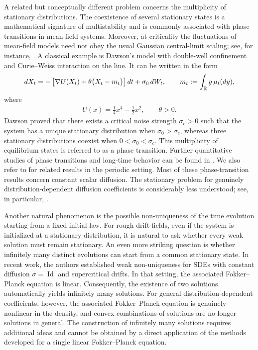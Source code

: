 \documentclass[10pt,a4paper]{amsart}
\numberwithin{equation}{section}
\def\dif{{\mathord{{\rm d}}}}
\def\dif{{\mathord{{\rm d}}}}
\begin{document}
A related but conceptually different problem concerns the multiplicity of
stationary distributions. The coexistence of several stationary states is a
mathematical signature of multistability and is commonly associated with phase
transitions in mean-field systems. Moreover, at criticality the fluctuations
of mean-field models need not obey the usual Gaussian central-limit scaling;
see, for instance, \cite{EN78a,EN78b,Daw83}.
A classical example is Dawson's model with double-well confinement and
Curie--Weiss interaction on the line. It can be written in the form
\begin{align}
\dif X_t
=
-
\left[
\nabla U(X_t)
+
\theta\bigl(X_t-m_t\bigr)
\right]\dif t
+
\sigma_0\,\dif W_t,
\qquad
m_t
:=
\int_{\mathbb{R}}y\,\mu_t(\dif y),\notag
\end{align}
where 
\begin{align*}
U(x)
=
\frac14x^4-\frac12x^2,
\qquad
\theta>0.
\end{align*}
Dawson \cite{Daw83} proved that there exists a critical noise strength
$\sigma_c>0$ such that the system has a unique stationary distribution when
$\sigma_0>\sigma_c$, whereas three stationary distributions coexist when
$0<\sigma_0<\sigma_c$. This multiplicity of equilibrium states is referred to
as a phase transition. Further quantitative studies of phase transitions and
long-time behavior can be found in
\cite{HT10,Tug10,Tug13,DT16}. We also refer to
\cite{CP10,CGPS20} for related results in the periodic setting.
Most of these phase-transition results concern constant scalar diffusion.  The stationary problem for genuinely
distribution-dependent diffusion coefficients is considerably less
understood; see, in particular, \cite{Zha23}.

Another natural phenomenon is the possible
non-uniqueness of the time evolution starting from a fixed initial law. For
rough drift fields, even if the system is initialized at a stationary
distribution, it is natural to ask whether every weak solution must remain
stationary.
An even more striking question is whether infinitely many distinct evolutions
can start from a common stationary state.
In recent work, the authors \cite{GG25,LRZ25,RZZ25,LR25} established weak non-uniqueness
for SDEs with constant diffusion
$\sigma=\operatorname{Id}$ and supercritical drifts.   In that setting,
the associated Fokker--Planck equation is linear. Consequently, the existence of two solutions automatically yields infinitely
many solutions. For general distribution-dependent coefficients, however, the
associated Fokker--Planck equation is genuinely nonlinear in the density, and
convex combinations of solutions are no longer solutions in general.
The construction of infinitely many solutions requires additional
ideas and cannot be obtained by a direct application of the methods developed
for a single linear Fokker--Planck equation.
 
\end{document}
